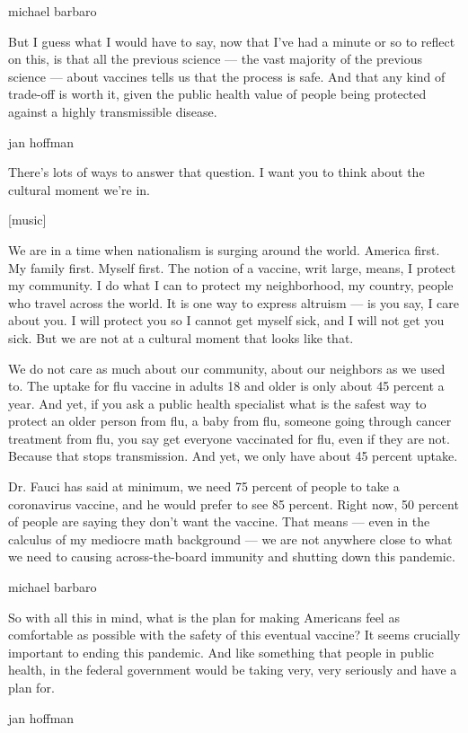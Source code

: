 michael barbaro

But I guess what I would have to say, now that I've had a minute or so
to reflect on this, is that all the previous science --- the vast
majority of the previous science --- about vaccines tells us that the
process is safe. And that any kind of trade-off is worth it, given the
public health value of people being protected against a highly
transmissible disease.

jan hoffman

There's lots of ways to answer that question. I want you to think about
the cultural moment we're in.

{[}music{]}

We are in a time when nationalism is surging around the world. America
first. My family first. Myself first. The notion of a vaccine, writ
large, means, I protect my community. I do what I can to protect my
neighborhood, my country, people who travel across the world. It is one
way to express altruism --- is you say, I care about you. I will protect
you so I cannot get myself sick, and I will not get you sick. But we are
not at a cultural moment that looks like that.

We do not care as much about our community, about our neighbors as we
used to. The uptake for flu vaccine in adults 18 and older is only about
45 percent a year. And yet, if you ask a public health specialist what
is the safest way to protect an older person from flu, a baby from flu,
someone going through cancer treatment from flu, you say get everyone
vaccinated for flu, even if they are not. Because that stops
transmission. And yet, we only have about 45 percent uptake.

Dr. Fauci has said at minimum, we need 75 percent of people to take a
coronavirus vaccine, and he would prefer to see 85 percent. Right now,
50 percent of people are saying they don't want the vaccine. That means
--- even in the calculus of my mediocre math background --- we are not
anywhere close to what we need to causing across-the-board immunity and
shutting down this pandemic.

michael barbaro

So with all this in mind, what is the plan for making Americans feel as
comfortable as possible with the safety of this eventual vaccine? It
seems crucially important to ending this pandemic. And like something
that people in public health, in the federal government would be taking
very, very seriously and have a plan for.

jan hoffman

